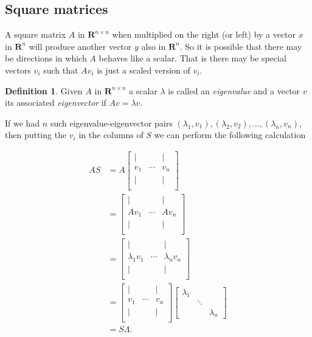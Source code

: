 \documentclass[]{article}
\theoremstyle{plain}
\theoremstyle{definition}
\newtheorem{defn}{Definition}
\theoremstyle{remark}
\newcommand{\reals}{\mathbf{R}}
\begin{document}
\subsection{Square matrices}\label{square-matrices}

A square matrix $A$ in $\reals^{n \times n}$ when multiplied on the right (or
left) by a vector $x$ in $\reals^n$ will produce another vector $y$ also in
$\reals^n$.  So it is possible that there may be directions in which $A$
behaves like a scalar.  That is there may be special vectors $v_i$ such that
$Av_i$ is just a scaled version of $v_i$.

\begin{defn}
Given $A$ in $\reals^{n \times n}$ a scalar $\lambda$ is called an
\emph{eigenvalue} and a vector $v$ its associated \emph{eigenvector} if
$Av = \lambda v$.
\end{defn}

If we had $n$ such eigenvalue-eigenvector pairs
$(\lambda_1, v_1), (\lambda_2, v_2), \dots, (\lambda_n, v_n)$,
then putting the $v_i$ in the columns of $S$ we can perform the following
calculation

\begin{align*}
 AS &= A \begin{bmatrix} | & & | \\
  v_1 & \cdots & v_n   \\
  | &  & | \\ 
\end{bmatrix} \\
&= \begin{bmatrix}
  | & & | \\
  Av_1 & \cdots & Av_n   \\
  | &  & | \\ 
\end{bmatrix}\\
&= \begin{bmatrix}
  | & & | \\
  \lambda_1 v_1 & \cdots & \lambda_n v_n   \\
  | &  & | \\ 
\end{bmatrix}\\
&=
\begin{bmatrix}
  | & & | \\
  v_1 & \cdots & v_n   \\
  | &  & | \\ 
\end{bmatrix}
\begin{bmatrix}\lambda_1\\
&  \ddots\\
&  & \lambda_n\end{bmatrix}\\
&= S\Lambda.
\end{align*}
\end{document}
